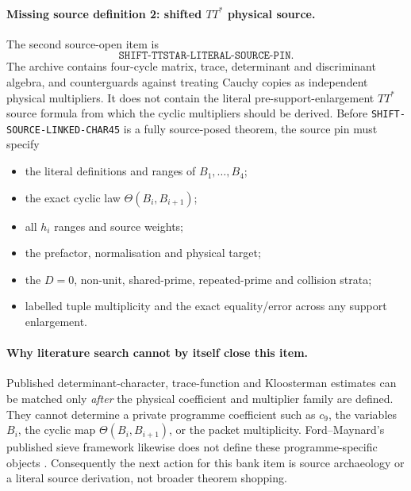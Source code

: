\documentclass[11pt]{article}
\theoremstyle{definition}
\newcommand{\1}{\mathbf 1}
\begin{document}
\paragraph{Missing source definition 2: shifted $TT^*$ physical source.}
The second source-open item is
\[
  \boxed{\texttt{SHIFT-TTSTAR-LITERAL-SOURCE-PIN}}.
\]
The archive contains four-cycle matrix, trace, determinant and discriminant
algebra, and counterguards against treating Cauchy copies as independent
physical multipliers.  It does not contain the literal pre-support-enlargement
$TT^*$ source formula from which the cyclic multipliers should be derived.
Before \texttt{SHIFT-SOURCE-LINKED-CHAR45} is a fully source-posed theorem,
the source pin must specify
\begin{itemize}
  \item the literal definitions and ranges of $B_1,\ldots,B_4$;
  \item the exact cyclic law $\Theta(B_i,B_{i+1})$;
  \item all $h_i$ ranges and source weights;
  \item the prefactor, normalisation and physical target;
  \item the $D=0$, non-unit, shared-prime, repeated-prime and collision strata;
  \item labelled tuple multiplicity and the exact equality/error across any
        support enlargement.
\end{itemize}

\paragraph{Why literature search cannot by itself close this item.}
Published determinant-character, trace-function and Kloosterman estimates can
be matched only \emph{after} the physical coefficient and multiplier family
are defined.  They cannot determine a private programme coefficient such as
$c_9$, the variables $B_i$, the cyclic map $\Theta(B_i,B_{i+1})$, or the
packet multiplicity.  Ford--Maynard's published sieve framework likewise does
not define these programme-specific objects \cite{FordMaynard2024}.
Consequently the next action for this bank item is source archaeology or a
literal source derivation, not broader theorem shopping.
\end{document}
